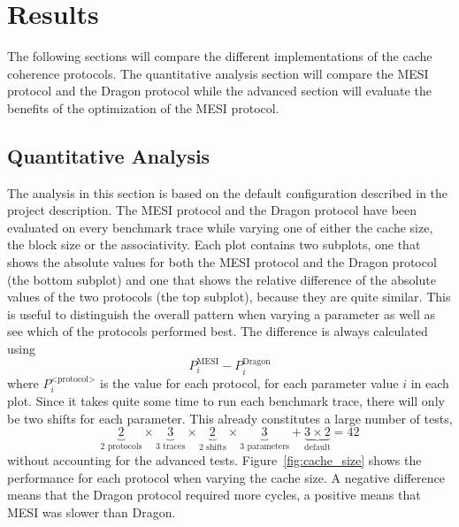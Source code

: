 \section{Results}
The following sections will compare the different implementations of the cache
coherence protocols. The quantitative analysis section will compare the MESI
protocol and the Dragon protocol while the advanced section will evaluate the
benefits of the optimization of the MESI protocol.

\subsection{Quantitative Analysis}


The analysis in this section is based on the default configuration described in
the project description. The MESI protocol and the Dragon protocol have been evaluated
on every benchmark trace while varying one of either the cache size, the block
size or the associativity. Each plot contains two subplots, one that shows the
absolute values for both the MESI protocol and the Dragon protocol (the bottom
subplot) and one that shows the relative difference of the absolute values of
the two protocols (the top subplot), because they are quite similar. This is useful to
distinguish the overall pattern when varying a parameter as well as see which of
the protocols performed best. The difference is always calculated using
$$
    P^\text{MESI}_i - P^\text{Dragon}_i
$$
where $ P^\text{<protocol>}_i $ is the value for each protocol, for each
parameter value $i$ in each plot. Since it takes quite some time to run each
benchmark trace, there will only be two shifts for each parameter. This already
constitutes a large number of tests,
$$
    \underbrace{2}_\text{2 protocols} \times \underbrace{3}_\text{3 traces} \times \underbrace{2}_\text{2 shifts} \times \underbrace{3}_\text{3 parameters} + \underbrace{3 \times 2}_\text{default} = 42
$$
without accounting for the advanced tests. Figure~\ref{fig:cache_size} shows
the performance for each protocol when varying the cache size. A negative
difference means that the Dragon protocol required more cycles, a positive means
that MESI was slower than Dragon.

